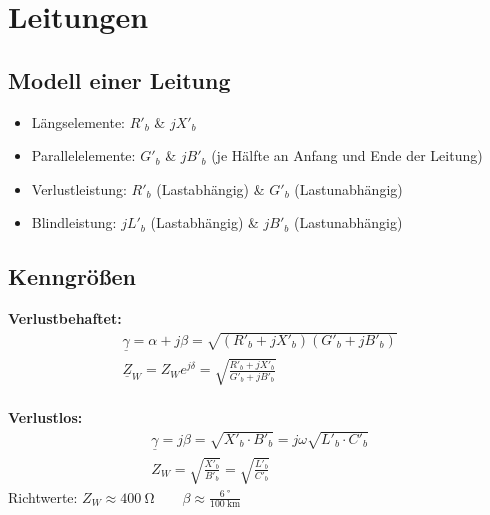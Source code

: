 \section{Leitungen}

\subsection{Modell einer Leitung}
    \begin{itemize}
        \item Längselemente: \(R'_b\) \& \(jX'_b\) 
        \item Parallelelemente: \(G'_b\) \& \(jB'_b\) (je Hälfte an Anfang und Ende der Leitung) 
        \item Verlustleistung: \(R'_b\) (Lastabhängig) \& \(G'_b\) (Lastunabhängig)
        \item Blindleistung: \(jL'_b\) (Lastabhängig) \& \(jB'_b\) (Lastunabhängig)
    \end{itemize}

\subsection{Kenngrößen}
    \textbf{Verlustbehaftet: }
    \begin{gather*}
        \underline{\gamma} = \alpha + j \beta = \sqrt{(R'_b + jX'_b)(G'_b + jB'_b)} \\
        \underline{Z}_W = Z_W e^{j\delta} = \sqrt{\frac{R'_b + jX'_b}{G'_b + jB'_b}} \\
    \end{gather*}

    \textbf{Verlustlos: }
    \begin{gather*}
        \underline{\gamma} = j \beta = \sqrt{X'_b \cdot B'_b} = j \omega \sqrt{L'_b \cdot C'_b} \\
        Z_W = \sqrt{\frac{X'_b}{B'_b}} = \sqrt{\frac{L'_b}{C'_b}} 
    \end{gather*}
    Richtwerte: \(Z_W \approx \SI{400}{\ohm} \qquad \beta \approx \frac{\SI{6}{\degree}}{\SI{100}{\kilo\meter}}\) 


